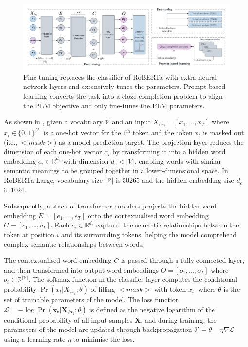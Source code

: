 \begin{figure}[!ht]
    \centering
    \includegraphics[width=\hsize]{figures/preparation_media/prepare-plm.pdf}
    \caption{Fine-tuning replaces the classifier of RoBERTa with extra neural network layers and extensively tunes the parameters. Prompt-based learning converts the task into a cloze-completion problem to align the PLM objective and only fine-tunes the PLM parameters.}
    \label{fig:prepare-plm}
\end{figure}

As shown in , given a vocabulary $\mathcal{V}$ and an input $X_{/x_t} = [x_1, ... , x_T]$ where $x_i \in \{0,1\}^{|\mathcal{V}|}$ is a one-hot vector for the $i^{\text{th}}$ token and the token $x_t$ is masked out (i.e., $<$$\textit{mask}$$>$) as a model prediction target. The projection layer reduces the dimension of each one-hot vector $x_i$ by transforming it into a hidden word embedding $e_i \in \mathbb{R}^{d_e}$ with dimension $d_e < |\mathcal{V}|$, enabling words with similar semantic meanings to be grouped together in a lower-dimensional space. In RoBERTa-Large, vocabulary size $|\mathcal{V}|$ is 50265 and the hidden embedding size $d_e$ is 1024. 

Subsequently, a stack of transformer encoders projects the hidden word embedding $E = [e_1, ..., e_T]$ onto the contextualised word embedding $C = [c_1, ..., c_T]$. Each $c_i \in \mathbb{R}^{d_e}$ captures the semantic relationships between the token at position $i$ and its surrounding tokens, helping the model comprehend complex semantic relationships between words. 

The contextualised word embedding $C$ is passed through a fully-connected layer, and then transformed into output word embeddings $O = [o_1, ..., o_T]$ where $o_i \in \mathbb{R}^{|\mathcal{V}|}$. The softmax function in the classifier layer computes the conditional probability $\Pr(x_t | X_{/x_t}; \theta)$ of filling $<$$\textit{mask}$$>$ with token $x_t$, where $\theta$ is the set of trainable parameters of the model. The loss function $\mathcal{L} = -\log \Pr(\boldsymbol{x_t}|\boldsymbol{X_{/x_t}}; \theta)$ is defined as the negative logarithm of the conditional probability of all input samples $\boldsymbol{X}$, and during training, the parameters of the model are updated through backpropagation $\theta' = \theta - \eta \nabla\mathcal{L}$ using a learning rate $\eta$ to minimise the loss.

